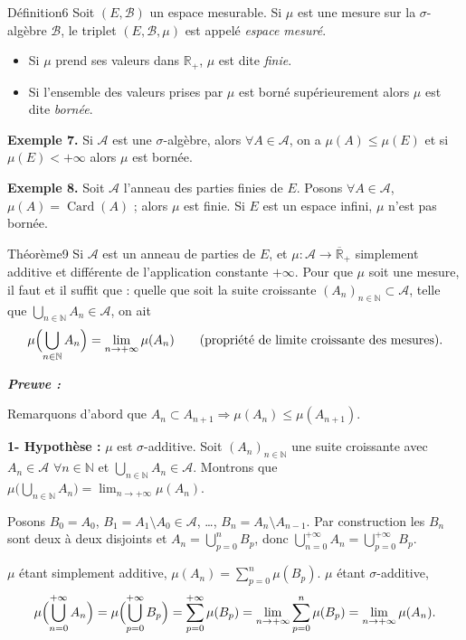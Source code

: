 \documentclass[11pt,a4paper]{article}
\newcommand{\R}{\mathbb{R}}
\newcommand{\N}{\mathbb{N}}
\newcommand{\Rb}{\overline{\mathbb{R}}}
\newcommand{\A}{\mathscr{A}}
\newcommand{\B}{\mathscr{B}}
\newenvironment{preuve}{\par\textit{\textbf{Preuve :}}\par\nopagebreak[4]}{\par}
\begin{document}
\begin{enonce}{Définition}{6}
Soit $(E,\B)$ un espace mesurable. Si $\mu$ est une mesure sur la $\sigma$-algèbre $\B$, le triplet $(E,\B,\mu)$ est appelé
\emph{espace mesuré}.
\begin{itemize}[leftmargin=1.2cm]
  \item Si $\mu$ prend ses valeurs dans $\R_+$, $\mu$ est dite \emph{finie}.
  \item Si l'ensemble des valeurs prises par $\mu$ est borné supérieurement alors $\mu$ est dite \emph{bornée}.
\end{itemize}
\end{enonce}

\textbf{\color{bleu}Exemple 7.} Si $\A$ est une $\sigma$-algèbre, alors $\forall A\in\A$, on a $\mu(A)\le\mu(E)$ et si $\mu(E)<+\infty$ alors
$\mu$ est bornée.

\textbf{\color{bleu}Exemple 8.} Soit $\A$ l'anneau des parties finies de $E$. Posons $\forall A\in\A$, $\mu(A)=\operatorname{Card}(A)$ ; alors $\mu$ est finie.
Si $E$ est un espace infini, $\mu$ n'est pas bornée.

\begin{enonce}{Théorème}{9}
Si $\A$ est un anneau de parties de $E$, et $\mu:\A\to\Rb_+$ simplement additive et différente de l'application constante $+\infty$.
Pour que $\mu$ soit une mesure, il faut et il suffit que : quelle que soit la suite croissante $(A_n)_{n\in\N}\subset\A$, telle que
$\displaystyle\bigcup_{n\in\N}A_n\in\A$, on ait
\[
  \mu\Bigl(\bigcup_{n\in\N}A_n\Bigr)=\lim_{n\to+\infty}\mu(A_n)
  \qquad\text{(propriété de limite croissante des mesures).}
\]
\end{enonce}

\begin{preuve}\end{preuve}
Remarquons d'abord que $A_n\subset A_{n+1}\Rightarrow\mu(A_n)\le\mu(A_{n+1})$.

\textbf{1- Hypothèse :} $\mu$ est $\sigma$-additive.
Soit $(A_n)_{n\in\N}$ une suite croissante avec $A_n\in\A$ $\forall n\in\N$ et $\bigcup_{n\in\N}A_n\in\A$.
Montrons que $\mu\bigl(\bigcup_{n\in\N}A_n\bigr)=\lim_{n\to+\infty}\mu(A_n)$.

Posons $B_0=A_0$, $B_1=A_1\setminus A_0\in\A$, \dots, $B_n=A_n\setminus A_{n-1}$.
Par construction les $B_n$ sont deux à deux disjoints et $A_n=\bigcup_{p=0}^{n}B_p$, donc $\bigcup_{n=0}^{+\infty}A_n=\bigcup_{p=0}^{+\infty}B_p$.

$\mu$ étant simplement additive, $\mu(A_n)=\sum_{p=0}^{n}\mu(B_p)$.
$\mu$ étant $\sigma$-additive,
\[
  \mu\Bigl(\bigcup_{n=0}^{+\infty}A_n\Bigr)=\mu\Bigl(\bigcup_{p=0}^{+\infty}B_p\Bigr)=\sum_{p=0}^{+\infty}\mu(B_p)
  =\lim_{n\to+\infty}\sum_{p=0}^{n}\mu(B_p)=\lim_{n\to+\infty}\mu(A_n).
\]
\end{document}
